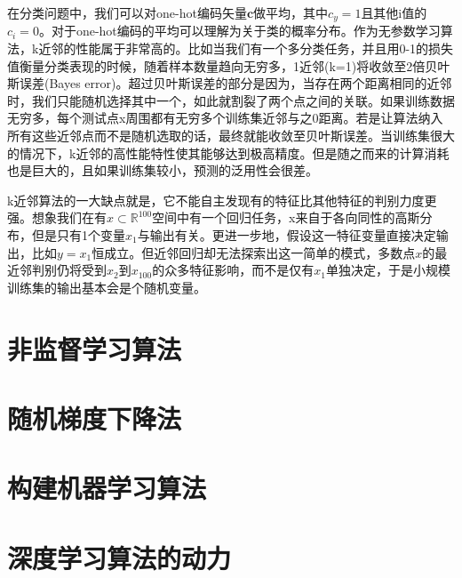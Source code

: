 在分类问题中，我们可以对one-hot编码矢量$\textbf{c}$做平均，其中$c_{y}=1$且其他i值的$c_{i}=0$。对于one-hot编码的平均可以理解为关于类的概率分布。作为无参数学习算法，k近邻的性能属于非常高的。比如当我们有一个多分类任务，并且用0-1的损失值衡量分类表现的时候，随着样本数量趋向无穷多，1近邻(k=1)将收敛至2倍贝叶斯误差(Bayes error)。超过贝叶斯误差的部分是因为，当存在两个距离相同的近邻时，我们只能随机选择其中一个，如此就割裂了两个点之间的关联。如果训练数据无穷多，每个测试点x周围都有无穷多个训练集近邻与之0距离。若是让算法纳入所有这些近邻点而不是随机选取的话，最终就能收敛至贝叶斯误差。当训练集很大的情况下，k近邻的高性能特性使其能够达到极高精度。但是随之而来的计算消耗也是巨大的，且如果训练集较小，预测的泛用性会很差。

k近邻算法的一大缺点就是，它不能自主发现有的特征比其他特征的判别力度更强。想象我们在有$x\subset\mathbb{R}^100$空间中有一个回归任务，x来自于各向同性的高斯分布，但是只有1个变量$x_{1}$与输出有关。更进一步地，假设这一特征变量直接决定输出，比如$y=x_{1}$恒成立。但近邻回归却无法探索出这一简单的模式，多数点$x$的最近邻判别仍将受到$x_{2}$到$x_{100}$的众多特征影响，而不是仅有$x_{1}$单独决定，于是小规模训练集的输出基本会是个随机变量。

\section{非监督学习算法}
\label{sec:5.8}

\section{随机梯度下降法}
\label{sec:5.9}

\section{构建机器学习算法}
\label{sec:5.10}

\section{深度学习算法的动力}
\label{sec:5.11}